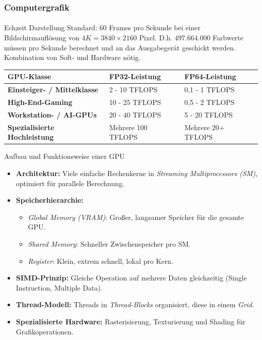 \documentclass{beamer}
\begin{document}
\begin{frame}
    \frametitle{Computergrafik}
\framesubtitle{}
    \begin{block}{Echzeit Darstellung}
Standard: $60$ Frames pro Sekunde bei einer Bildschirmauflösung von $4K=3840 \times 2160$ Pixel.  
D.h. $497.664.000$ Farbwerte müssen pro Sekunde berechnet und an das Ausgabegerät
geschickt werden. 
Kombination von Soft- und Hardware nötig.
\end{block}
\begin{table}[h]
    \centering
    \tiny %
    \begin{tabular}{|l|l|l|}
    \hline
    \textbf{GPU-Klasse} & \textbf{FP32-Leistung} & \textbf{FP64-Leistung} \\ \hline
    \textbf{Einsteiger- / Mittelklasse} & 2 - 10 TFLOPS & 0,1 - 1 TFLOPS \\ \hline
    \textbf{High-End-Gaming} & 10 - 25 TFLOPS & 0,5 - 2 TFLOPS \\ \hline
    \textbf{Workstation- / AI-GPUs} & 20 - 40 TFLOPS & 5 - 20 TFLOPS \\ \hline
    \textbf{Spezialisierte Hochleistung} & Mehrere 100 TFLOPS & Mehrere 20+ TFLOPS \\ \hline
    \end{tabular}
    \end{table}

\end{frame}




\begin{frame}{Aufbau und Funktionsweise einer GPU}
    \begin{itemize}
      \item \textbf{Architektur:} Viele einfache Rechenkerne in \textit{Streaming Multiprocessors (SM)}, optimiert für parallele Berechnung.
      \item \textbf{Speicherhierarchie:}
      \begin{itemize}
        \item \textit{Global Memory (VRAM)}: Großer, langsamer Speicher für die gesamte GPU.
        \item \textit{Shared Memory}: Schneller Zwischenspeicher pro SM.
        \item \textit{Register}: Klein, extrem schnell, lokal pro Kern.
      \end{itemize}
      \item \textbf{SIMD-Prinzip:} Gleiche Operation auf mehrere Daten gleichzeitig (Single Instruction, Multiple Data).
      \item \textbf{Thread-Modell:} Threads in \textit{Thread-Blocks} organisiert, diese in einem \textit{Grid}.
      \item \textbf{Spezialisierte Hardware:} Rasterisierung, Texturierung und Shading für Grafikoperationen.
    \end{itemize}
  \end{frame}
\end{document}
